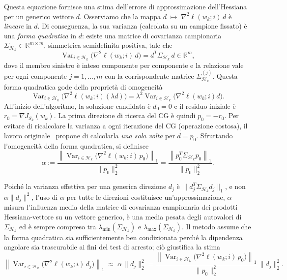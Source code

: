\documentclass[a4paper,12pt]{article}
\numberwithin{equation}{section}
\numberwithin{figure}{section}
\numberwithin{table}{section}
\begin{document}
Questa equazione fornisce una stima dell'errore di approssimazione dell'Hessiana per un generico vettore $d$.
Osserviamo che la mappa 
$d \;\longmapsto\; \nabla^2\ell(w_k;i)\,d$
è \emph{lineare} in $d$. Di conseguenza, la sua varianza (calcolata su un campione fissato) è una \emph{forma quadratica} in $d$: esiste una matrice di covarianza campionaria $\Sigma_{\mathcal{H}_k} \in \mathbb{R}^{m\times m}$, simmetrica semidefinita positiva, tale che
\[
\operatorname{Var}_{i\in\mathcal{H}_k}\bigl(\nabla^2\ell(w_k;i)\,d\bigr)
= d^T \Sigma_{\mathcal{H}_k}\, d \in \mathbb{R}^m,
\]
dove il membro sinistro è inteso componente per componente e la relazione vale per ogni componente $j=1,\dots,m$ con la corrispondente matrice $\Sigma_{\mathcal{H}_k}^{(j)}$. Questa forma quadratica gode della proprietà di omogeneità
\[
\operatorname{Var}_{i\in\mathcal{H}_k}\bigl(\nabla^2\ell(w_k;i)(\lambda d)\bigr)
= \lambda^2 \operatorname{Var}_{i\in\mathcal{H}_k}\bigl(\nabla^2\ell(w_k;i)d\bigr).
\]
\medskip
\noindent
All'inizio dell'algoritmo, la soluzione candidata è $d_0 = 0$ e il residuo iniziale è $r_0 = \nabla J_{\mathcal{S}_k}(w_k)$. La prima direzione di ricerca del CG è quindi $p_0 = -r_0$. 
Per evitare di ricalcolare la varianza a ogni iterazione del CG (operazione costosa), il lavoro originale~\cite{byrd2012} propone di calcolarla \emph{una sola volta} per $d = p_0$. Sfruttando l'omogeneità della forma quadratica, si definisce
\[
\alpha := \frac{\left\| \operatorname{Var}_{i\in\mathcal{H}_k}\bigl(\nabla^2\ell(w_k;i)\,p_0\bigr) \right\|_1}{\|p_0\|_2^2}
= \frac{\left\| p_0^T \Sigma_{\mathcal{H}_k} p_0 \right\|_1}{\|p_0\|_2^2}.
\tag{5.36}
\]

Poiché la varianza effettiva per una generica direzione $d_j$ è $\|d_j^T \Sigma_{\mathcal{H}_k} d_j\|_1$, e non $\alpha\|d_j\|^2$, l'uso di $\alpha$ per tutte le direzioni costituisce un'approssimazione, $\alpha$ misura l'influenza media della matrice di covarianza campionaria dei prodotti Hessiana-vettore su un vettore generico, è una media pesata degli autovalori di $\Sigma_{\mathcal{H}_k}$ ed è sempre compreso tra $\lambda_{\min}(\Sigma_{\mathcal{H}_k})$ e $\lambda_{\max}(\Sigma_{\mathcal{H}_k})$. Il metodo assume che la forma quadratica sia sufficientemente ben condizionata perché la dipendenza angolare sia trascurabile ai fini del test di arresto; ciò giustifica la stima
\[\left\| \operatorname{Var}_{i\in\mathcal{H}_k}\bigl(\nabla^2\ell(w_k;i)\,d_j\bigr) \right\|_1
\;\approx\;
\alpha \, \|d_j\|_2^2
=
\frac{\left\| \operatorname{Var}_{i\in\mathcal{H}_k}\bigl(\nabla^2\ell(w_k;i)\,p_0\bigr) \right\|_1}{\|p_0\|_2^2} \, \|d_j\|_2^2.
\tag{5.37}
\]
\end{document}

